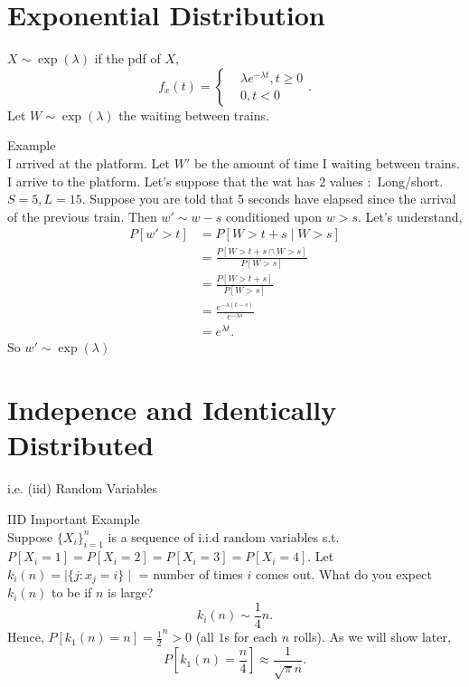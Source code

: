 \documentclass[a4paper]{article}
\begin{document}
\section{Exponential Distribution}
  \begin{definition}
    $X \sim \exp(\lambda)$ if the pdf of $X$, 
     \[
    f_{x}(t) = \begin{cases}
      &\lambda e^{-\lambda t}, t \geq 0 \\
      & 0, t < 0
    \end{cases}
    .\] 
    Let $W \sim \exp(\lambda)$ the waiting between trains.
  \end{definition}
\begin{note}{Example}\\
  I arrived at the platform. Let $W'$ be the amount of time I  waiting between trains. I arrive to the platform.  Let's suppose that the wat has $2$ values $:$ Long/short.  $S=5, L=15$. Suppose you are told that 5 seconds have elapsed since the arrival of the previous train. Then $w' \sim w - s$ conditioned upon  $w > s$. Let's understand,
   \begin{align*}
     P[w' > t] &= P[W > t +s \mid  W > s] \\
               &= \frac{P[W > t + s \cap W > s]}{P[W > s]} \\
               &= \frac{P[W > t +s]}{P[W > s]} \\
               &= \frac{e^{- \lambda (t-s)}}{e^{-\lambda s}} \\
               &= e^{\lambda t}
  .\end{align*}
  So $w' \sim \exp(\lambda)$
\end{note}

\section{Indepence and Identically Distributed}
i.e. (iid) Random Variables

\begin{note}{IID Important Example}\\
Suppose $\{X_i\}_{i=1}^{n}$ is a sequence of i.i.d random variables s.t. $P[X_i=1] = P[X_i=2] = P[X_i=3] = P[X_i=4]$. Let $k_i(n) = \mid \{j: x_j = i\} \mid $ = number of times $i$ comes out. What do you expect  $k_i(n)$ to be if  $n$ is large?
 \[
k_i(n) \sim \frac{1}{4} n
.\] 
Hence, $P[k_1(n) = n] = \frac{1}{2}^{n} > 0$ (all $1$s for each  $n$ rolls). As we will show later,
\[
  P[k_1(n) = \frac{n}{4}] \approx \frac{1}{\sqrt{\pi} n } 
.\] 
\end{note}
\end{document}
